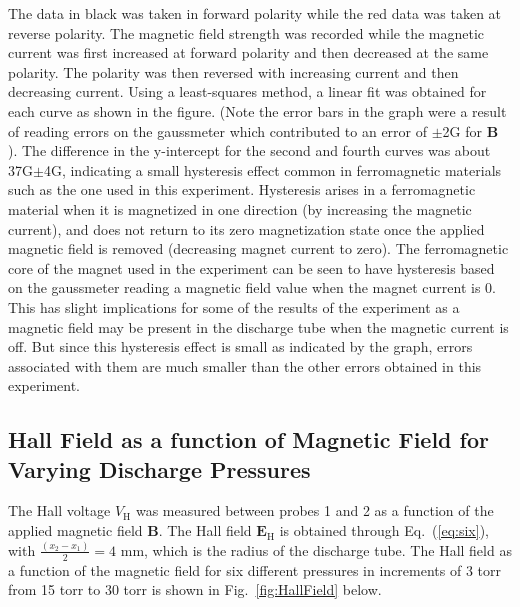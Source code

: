 \documentclass[%
 aip,
rsi,%
 amsmath,amssymb,
 reprint,%
author-numerical,%
]{revtex4-1}
\begin{document}
The data in black was taken in forward polarity while the red data was taken at reverse polarity. The magnetic field strength was recorded while the magnetic current was first increased at forward polarity and then decreased at the same polarity. The polarity was then reversed with increasing current and then decreasing current. Using a least-squares method, a linear fit was obtained for each curve as shown in the figure. (Note the error bars in the graph were a result of reading errors on the gaussmeter which contributed to an error of $\pm$2G for $\boldsymbol { B }$ ).
 The difference in the y-intercept  for the second and fourth curves was about 37G$\pm$4G, indicating a small hysteresis effect common in ferromagnetic materials such as the one used in this experiment. \newline
\indent Hysteresis arises in a ferromagnetic material when it is magnetized in one direction (by increasing the magnetic current), and does not return to its zero magnetization state once the applied magnetic field is removed (decreasing magnet current to zero). The ferromagnetic core of the magnet used in the experiment can be seen to have hysteresis based on the gaussmeter reading a magnetic field value when the magnet current is 0. This has slight implications for some of the results of the experiment as a magnetic field may be present in the discharge tube when the magnetic current is off. But since this hysteresis effect is small as indicated by the graph, errors associated with them are much smaller than the other errors obtained in this experiment.

\subsection{Hall Field as a function of Magnetic Field for Varying Discharge Pressures}
The Hall voltage $V _ { \mathrm { H } }$ was measured between probes 1 and 2 as a function of the applied magnetic field $\boldsymbol { B }$. The Hall field $\boldsymbol { E } _ { \mathrm { H } }$ is obtained through Eq.~(\ref{eq:six}), with $\frac { ( x _ { 2 } - x _ { 1 } ) } { 2 }=4$ mm, which is the radius of the discharge tube. The Hall field as a function of the magnetic field for six different pressures in increments of 3 torr from 15 torr to 30 torr is shown in Fig.~\ref{fig:HallField} below.
\end{document}
